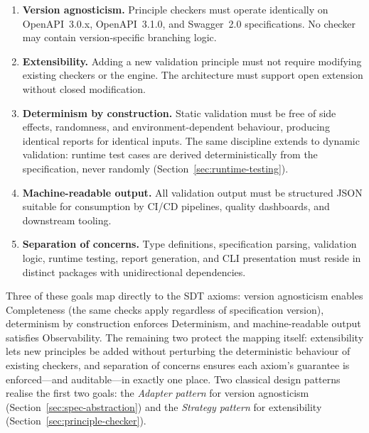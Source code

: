 \begin{enumerate}
    \item \textbf{Version agnosticism.} Principle checkers must operate identically on OpenAPI~3.0.x, OpenAPI~3.1.0, and Swagger~2.0 specifications. No checker may contain version-specific branching logic.

    \item \textbf{Extensibility.} Adding a new validation principle must not require modifying existing checkers or the engine. The architecture must support open extension without closed modification.

    \item \textbf{Determinism by construction.} Static validation must be free of side effects, randomness, and environment-dependent behaviour, producing identical reports for identical inputs. The same discipline extends to dynamic validation: runtime test cases are derived deterministically from the specification, never randomly (Section~\ref{sec:runtime-testing}).

    \item \textbf{Machine-readable output.} All validation output must be structured JSON suitable for consumption by CI/CD pipelines, quality dashboards, and downstream tooling.

    \item \textbf{Separation of concerns.} Type definitions, specification parsing, validation logic, runtime testing, report generation, and CLI presentation must reside in distinct packages with unidirectional dependencies.
\end{enumerate}

Three of these goals map directly to the SDT axioms: version agnosticism enables Completeness (the same checks apply regardless of specification version), determinism by construction enforces Determinism, and machine-readable output satisfies Observability. The remaining two protect the mapping itself: extensibility lets new principles be added without perturbing the deterministic behaviour of existing checkers, and separation of concerns ensures each axiom's guarantee is enforced---and auditable---in exactly one place. Two classical design patterns~\cite{gof} realise the first two goals: the \textit{Adapter pattern} for version agnosticism (Section~\ref{sec:spec-abstraction}) and the \textit{Strategy pattern} for extensibility (Section~\ref{sec:principle-checker}).

